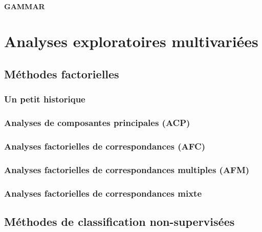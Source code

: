 \documentclass[
  11pt,
  french,
]{book}
\begin{document}
\hypertarget{sect0922}{%
\subsection{GAMMAR}\label{sect0922}}

\hypertarget{part-analyses-exploratoires-multivariuxe9es}{%
\part{Analyses exploratoires multivariées}\label{part-analyses-exploratoires-multivariuxe9es}}

\hypertarget{chap10}{%
\chapter{Méthodes factorielles}\label{chap10}}

\hypertarget{sect101}{%
\section{Un petit historique}\label{sect101}}

\hypertarget{sect102}{%
\section{Analyses de composantes principales (ACP)}\label{sect102}}

\hypertarget{sect103}{%
\section{Analyses factorielles de correspondances (AFC)}\label{sect103}}

\hypertarget{sect104}{%
\section{Analyses factorielles de correspondances multiples (AFM)}\label{sect104}}

\hypertarget{sect105}{%
\section{Analyses factorielles de correspondances mixte}\label{sect105}}

\hypertarget{chap11}{%
\chapter{Méthodes de classification non-supervisées}\label{chap11}}
\end{document}
